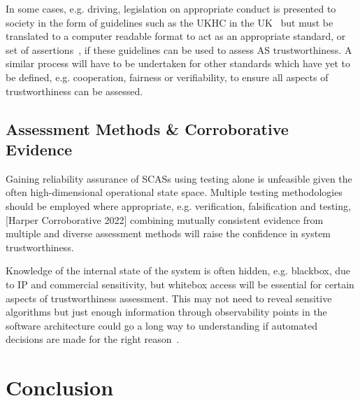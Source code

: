 In some cases, e.g. driving, legislation on appropriate conduct is presented to society in the form of guidelines such as the UKHC in the UK~\cite{highwayCode} but must be translated to a computer readable format to act as an appropriate standard, or set of assertions~\cite{harper2021safety}, if these guidelines can be used to assess AS trustworthiness. A similar process will have to be undertaken for other standards which have yet to be defined, e.g. cooperation, fairness or verifiability, to ensure all aspects of trustworthiness can be assessed. 



\subsection{Assessment Methods \& Corroborative Evidence} \label{sec:AssFramVis-AssMthds}
Gaining reliability assurance of SCASs using testing alone is unfeasible given the often high-dimensional operational state space. Multiple testing methodologies should be employed where appropriate, e.g. verification, falsification and testing, [Harper Corroborative 2022] combining mutually consistent evidence from multiple and diverse assessment methods will raise the confidence in system trustworthiness.

Knowledge of the internal state of the system is often hidden, e.g. blackbox, due to IP and commercial sensitivity, but whitebox access will be essential for certain aspects of trustworthiness assessment. This may not need to reveal sensitive algorithms but just enough information through observability points in the software architecture could go a long way to understanding if automated decisions are made for the right reason~\cite{koopman2018toward}. 




\section{Conclusion} \label{sec:conc}

